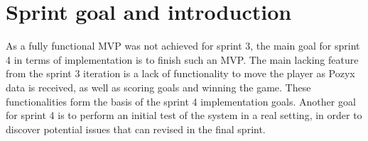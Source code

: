 \section{Sprint goal and introduction}
As a fully functional MVP was not achieved for sprint 3, the main goal for sprint 4 in terms of implementation is to finish such an MVP.
The main lacking feature from the sprint 3 iteration is a lack of functionality to move the player as Pozyx data is received, as well as scoring goals and winning the game.
These functionalities form the basis of the sprint 4 implementation goals.
Another goal for sprint 4 is to perform an initial test of the system in a real setting, in order to discover potential issues that can revised in the final sprint.